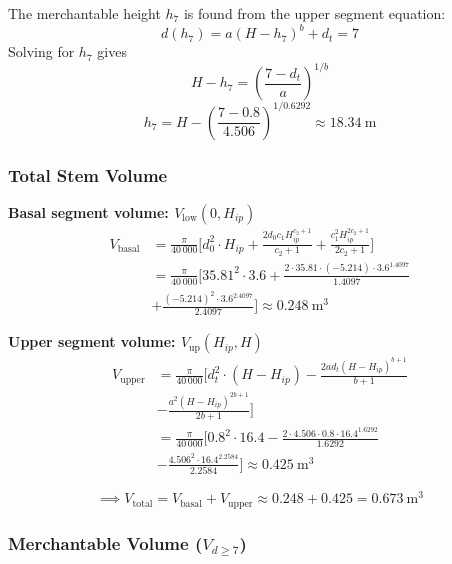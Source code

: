 \documentclass[twocolumn, bibliography=totoc]{scrartcl}
\begin{document}
The merchantable height $h_7$ is found from the upper segment equation:
\begin{equation}
d(h_7) = a (H - h_7)^b + d_t = 7
\end{equation}
Solving for $h_7$ gives
\begin{equation}
H - h_7 = \left(\frac{7 - d_t}{a}\right)^{1/b}
\end{equation}
\begin{equation}
h_7 = H - \left(\frac{7 - 0.8}{4.506}\right)^{1/0.6292}
\approx 18.34\ \text{m}
\end{equation}

\subsubsection*{Total Stem Volume}

\textbf{Basal segment volume: $V_{\text{low}}(0, H_{ip})$}
\begin{equation}
\begin{aligned}
V_{\text{basal}} &= \frac{\pi}{40\,000} \Big[
d_0^2 \cdot H_{ip} 
+ \frac{2 d_0 c_1 H_{ip}^{c_2+1}}{c_2 + 1} 
+ \frac{c_1^2 H_{ip}^{2c_2+1}}{2c_2 + 1} 
\Big] \\
&= \frac{\pi}{40\,000} \Big[
35.81^2 \cdot 3.6 
+ \frac{2 \cdot 35.81 \cdot (-5.214) \cdot 3.6^{1.4097}}{1.4097} \\
& + \frac{(-5.214)^2 \cdot 3.6^{2.4097}}{2.4097} 
\Big] \approx 0.248\ \text{m}^3
\end{aligned}
\end{equation}

\textbf{Upper segment volume: $V_{\text{up}}(H_{ip}, H)$}
\begin{equation}
\begin{aligned}
V_{\text{upper}} &= \frac{\pi}{40\,000} \Big[
d_t^2 \cdot (H - H_{ip}) 
- \frac{2 a d_t (H - H_{ip})^{b+1}}{b+1} \\
& - \frac{a^2 (H - H_{ip})^{2b+1}}{2b+1} 
\Big] \\
&= \frac{\pi}{40\,000} \Big[
0.8^2 \cdot 16.4 
- \frac{2 \cdot 4.506 \cdot 0.8 \cdot 16.4^{1.6292}}{1.6292} \\
& - \frac{4.506^2 \cdot 16.4^{2.2584}}{2.2584} 
\Big] \approx 0.425\ \text{m}^3
\end{aligned}
\end{equation}

\[
\implies V_{\text{total}} = V_{\text{basal}} + V_{\text{upper}} \approx 0.248 + 0.425 = 0.673\ \text{m}^3
\]

\subsubsection*{Merchantable Volume ($V_{d \ge 7}$)}
\end{document}
